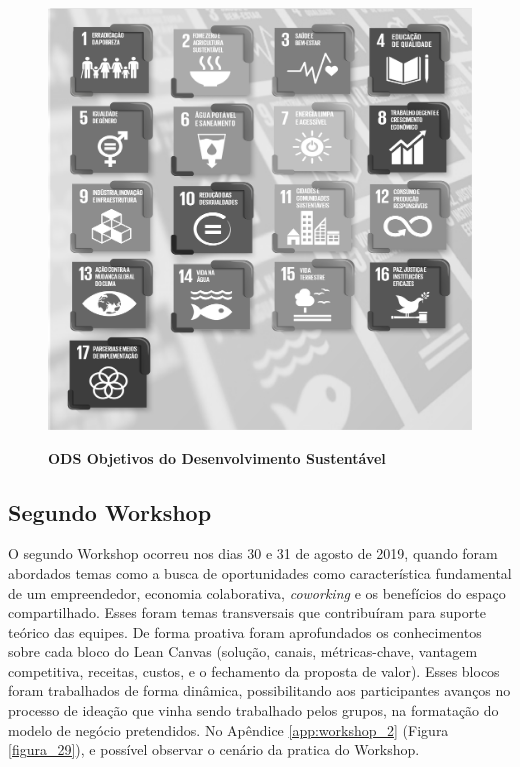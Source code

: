 \begin{figure}[H]
\centering
\caption{\textbf{ODS Objetivos do Desenvolvimento Sustentável}}
\includegraphics[scale=0.15]{Imagens/ODS_GERAL.png}
\label{fig:ods}
\end{figure}


\subsection{Segundo Workshop}


O segundo Workshop ocorreu nos dias 30 e 31 de agosto de 2019, quando foram abordados temas como a busca de oportunidades como característica fundamental de um empreendedor, economia colaborativa, \textit{coworking} e os benefícios do espaço compartilhado. Esses foram temas transversais que contribuíram para suporte teórico das equipes. De forma proativa foram aprofundados os conhecimentos sobre cada bloco do Lean Canvas (solução, canais, métricas-chave, vantagem competitiva, receitas, custos, e o fechamento da proposta de valor). Esses blocos foram trabalhados de forma dinâmica, possibilitando aos participantes avanços no processo de ideação que vinha sendo trabalhado pelos grupos, na formatação do modelo de negócio pretendidos. No Apêndice \ref{app:workshop_2}  (Figura \ref{figura_29}), 
e possível observar o cenário da pratica do Workshop.
 

